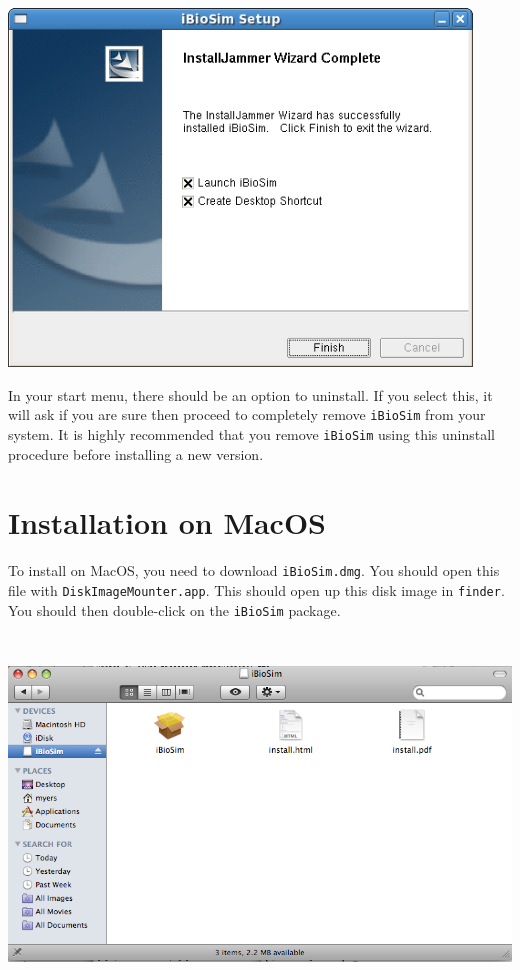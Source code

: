 \documentclass[titlepage,11pt]{article}
\begin{document}
\includegraphics[height=95mm]{screenshots/finish}

In your start menu, there should be an option to uninstall.  If you
select this, it will ask if you are sure then proceed to completely
remove {\tt iBioSim} from your system.  It is highly recommended that
you remove {\tt iBioSim} using this uninstall procedure before
installing a new version.

\clearpage

\section{Installation on MacOS}

\noindent
To install on MacOS, you need to download {\tt iBioSim.dmg}.  You should
open this file with {\tt DiskImageMounter.app}.  This should open up
this disk image in {\tt finder}.  You should then
double-click on the {\tt iBioSim} package.  

\includegraphics[height=95mm]{screenshots/finder}
\end{document}

